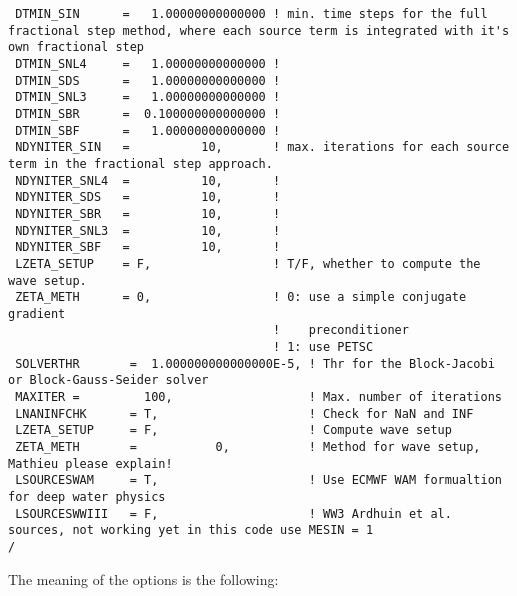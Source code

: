 \documentclass[12pt]{amsart}
\begin{document}
\begin{verbatim}
 DTMIN_SIN      =   1.00000000000000 ! min. time steps for the full fractional step method, where each source term is integrated with it's own fractional step
 DTMIN_SNL4     =   1.00000000000000 !    
 DTMIN_SDS      =   1.00000000000000 !    
 DTMIN_SNL3     =   1.00000000000000 !   
 DTMIN_SBR      =  0.100000000000000 !    
 DTMIN_SBF      =   1.00000000000000 !    
 NDYNITER_SIN   =          10,       ! max. iterations for each source term in the fractional step approach. 
 NDYNITER_SNL4  =          10,       !
 NDYNITER_SDS   =          10,       !
 NDYNITER_SBR   =          10,       !
 NDYNITER_SNL3  =          10,       ! 
 NDYNITER_SBF   =          10,       !
 LZETA_SETUP    = F,                 ! T/F, whether to compute the wave setup.
 ZETA_METH      = 0,                 ! 0: use a simple conjugate gradient
                                     !    preconditioner
                                     ! 1: use PETSC
 SOLVERTHR       =  1.000000000000000E-5, ! Thr for the Block-Jacobi or Block-Gauss-Seider solver
 MAXITER =         100,                   ! Max. number of iterations 
 LNANINFCHK      = T,                     ! Check for NaN and INF
 LZETA_SETUP     = F,                     ! Compute wave setup 
 ZETA_METH       =           0,           ! Method for wave setup, Mathieu please explain!
 LSOURCESWAM     = T,                     ! Use ECMWF WAM formualtion for deep water physics 
 LSOURCESWWIII   = F,                     ! WW3 Ardhuin et al. sources, not working yet in this code use MESIN = 1 
/
\end{verbatim}
The meaning of the options is the following:
\end{document}
